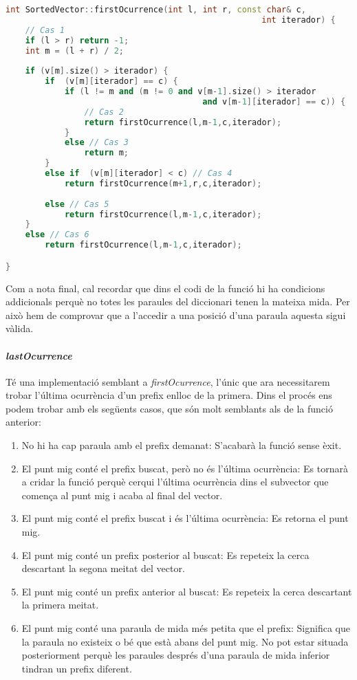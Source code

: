 \documentclass[titlepage]{article}
\begin{document}
\begin{lstlisting}[language=C++]
int SortedVector::firstOcurrence(int l, int r, const char& c,
                                                    int iterador) {
    // Cas 1
    if (l > r) return -1;
    int m = (l + r) / 2;
    
    if (v[m].size() > iterador) { 
        if  (v[m][iterador] == c) {
            if (l != m and (m != 0 and v[m-1].size() > iterador
                                        and v[m-1][iterador] == c)) {
                // Cas 2
                return firstOcurrence(l,m-1,c,iterador);
            } 
            else // Cas 3
                return m;
        }
        else if  (v[m][iterador] < c) // Cas 4
            return firstOcurrence(m+1,r,c,iterador);
            
        else // Cas 5
            return firstOcurrence(l,m-1,c,iterador);
    }
    else // Cas 6
        return firstOcurrence(l,m-1,c,iterador);

}
\end{lstlisting}

Com a nota final, cal recordar que dins el codi de la funció hi ha condicions addicionals perquè no totes les paraules del diccionari tenen la mateixa mida. Per això hem de comprovar que a l'accedir a una posició d'una paraula aquesta sigui vàlida. 

\paragraph{\textit{lastOcurrence}} Té una implementació semblant a \textit{firstOcurrence}, l'únic que ara necessitarem trobar l'última ocurrència d'un prefix enlloc de la primera. Dins el procés ens podem trobar amb els següents casos, que són molt semblants als de la funció anterior:

\begin{enumerate}
  \item No hi ha cap paraula amb el prefix demanat: S'acabarà la funció sense èxit.
  \item El punt mig conté el prefix buscat, però no és l'última ocurrència: Es tornarà a cridar la funció perquè cerqui l'última ocurrència dins el subvector que comença al punt mig i acaba al final del vector.
  \item El punt mig conté el prefix buscat i és l'última ocurrència: Es retorna el punt mig.
  \item El punt mig conté un prefix posterior al buscat: Es repeteix la cerca descartant la segona meitat del vector.
  \item El punt mig conté un prefix anterior al buscat: Es repeteix la cerca descartant la primera  meitat.
  \item El punt mig conté una paraula de mida més petita que el prefix: Significa que la paraula no existeix o bé que està abans del punt mig. No pot estar situada posteriorment perquè les paraules després d'una paraula de mida inferior tindran un prefix diferent.
\end{enumerate}
\end{document}
